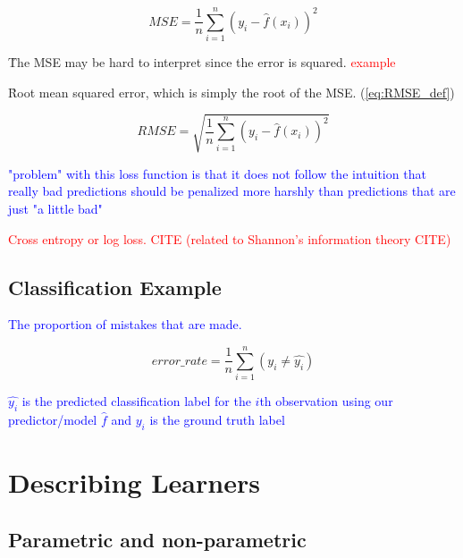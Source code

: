 \begin{equation}
{MSE = \frac{1}{n}\sum_{i=1}^{n}(y_i - \hat{f}(x_i))^2}
\label{eq:MSE_def}
\end{equation}

\r{The MSE may be hard to interpret since the error is squared. \textcolor{red}{example}}

\r{Root mean squared error, which is simply the root of the MSE. (\ref{eq:RMSE_def})}

\begin{equation}
{RMSE = \sqrt{\frac{1}{n}\sum_{i=1}^{n}(y_i - \hat{f}(x_i))^2}}
\label{eq:RMSE_def}
\end{equation}

\textcolor{blue}{"problem" with this loss function is that it does not follow the intuition that really bad predictions should be penalized more harshly than predictions that are just "a little bad"}

\textcolor{red}{Cross entropy or log loss. \textcolor{red}{CITE} (related to Shannon's information theory \textcolor{red}{CITE})}




\subsection{Classification Example}

\textcolor{blue}{The proportion of mistakes that are made.}

\begin{equation}
{error\_rate = \frac{1}{n}\sum_{i=1}^{n}(y_i \ne \hat{y_i})}
\label{eq:class_error_rate_def}
\end{equation}

\textcolor{blue}{$\hat{y_i}$ is the predicted classification label for the $i$th observation using our predictor/model $\hat{f}$ and $y_i$ is the ground truth label}

\section{Describing Learners}

\subsection{Parametric and non-parametric}


